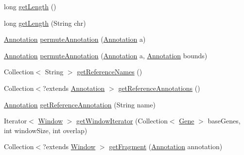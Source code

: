 \begin{DoxyCompactItemize}
\item 
long \hyperlink{classumms_1_1core_1_1coordinatesystem_1_1_masked_genomic_space_a02d96b1cd3cd75f0134b149eb566ed8b}{get\+Length} ()
\item 
long \hyperlink{classumms_1_1core_1_1coordinatesystem_1_1_masked_genomic_space_a945a120ce0902e801be3c96be317a9a9}{get\+Length} (String chr)
\item 
\hyperlink{interfaceumms_1_1core_1_1annotation_1_1_annotation}{Annotation} \hyperlink{classumms_1_1core_1_1coordinatesystem_1_1_masked_genomic_space_ac6ca6a5892e2188d56aa101e3aca58b9}{permute\+Annotation} (\hyperlink{interfaceumms_1_1core_1_1annotation_1_1_annotation}{Annotation} a)
\item 
\hyperlink{interfaceumms_1_1core_1_1annotation_1_1_annotation}{Annotation} \hyperlink{classumms_1_1core_1_1coordinatesystem_1_1_masked_genomic_space_a19020ef8f9f1b1b07254524872c0e09a}{permute\+Annotation} (\hyperlink{interfaceumms_1_1core_1_1annotation_1_1_annotation}{Annotation} a, \hyperlink{interfaceumms_1_1core_1_1annotation_1_1_annotation}{Annotation} bounds)
\item 
Collection$<$ String $>$ \hyperlink{classumms_1_1core_1_1coordinatesystem_1_1_masked_genomic_space_a4e5bf7a2a3cb551e7135205b8d59f854}{get\+Reference\+Names} ()
\item 
Collection$<$?extends \hyperlink{interfaceumms_1_1core_1_1annotation_1_1_annotation}{Annotation} $>$ \hyperlink{classumms_1_1core_1_1coordinatesystem_1_1_masked_genomic_space_a2f24dd26327cbf0149e784c49cb6d033}{get\+Reference\+Annotations} ()
\item 
\hyperlink{interfaceumms_1_1core_1_1annotation_1_1_annotation}{Annotation} \hyperlink{classumms_1_1core_1_1coordinatesystem_1_1_masked_genomic_space_aa30285093525e3869868a0d581bfc9ca}{get\+Reference\+Annotation} (String name)
\item 
Iterator$<$ \hyperlink{interfaceumms_1_1core_1_1feature_1_1_window}{Window} $>$ \hyperlink{classumms_1_1core_1_1coordinatesystem_1_1_masked_genomic_space_aa9391fb43bc3bdf03cd4a69fb8622829}{get\+Window\+Iterator} (Collection$<$ \hyperlink{classumms_1_1core_1_1annotation_1_1_gene}{Gene} $>$ base\+Genes, int window\+Size, int overlap)
\item 
Collection$<$?extends \hyperlink{interfaceumms_1_1core_1_1feature_1_1_window}{Window} $>$ \hyperlink{classumms_1_1core_1_1coordinatesystem_1_1_masked_genomic_space_a9e4f8800b0d7eba0db96b9ee8bf09f46}{get\+Fragment} (\hyperlink{interfaceumms_1_1core_1_1annotation_1_1_annotation}{Annotation} annotation)

\end{DoxyCompactItemize}
